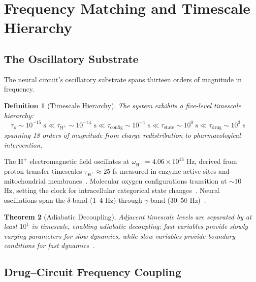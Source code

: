 \documentclass[twocolumn,10pt]{article}
\newtheorem{theorem}{Theorem}[section]
\newtheorem{definition}[theorem]{Definition}
\theoremstyle{remark}
\newcommand{\Hplus}{\mathrm{H}^{+}}
\begin{document}
\section{Frequency Matching and Timescale Hierarchy}
\label{sec:frequency}

\subsection{The Oscillatory Substrate}

The neural circuit's oscillatory substrate spans thirteen orders of magnitude in frequency.

\begin{definition}[Timescale Hierarchy]
\label{def:timescale}
The system exhibits a five-level timescale hierarchy:
\begin{equation}
  \tau_\rho \sim 10^{-15}\;\mathrm{s} \ll \tau_{\Hplus} \sim 10^{-14}\;\mathrm{s} \ll \tau_{\mathrm{config}} \sim 10^{-1}\;\mathrm{s} \ll \tau_{\mathrm{state}} \sim 10^{0}\;\mathrm{s} \ll \tau_{\mathrm{drug}} \sim 10^{3}\;\mathrm{s}
\end{equation}
spanning 18 orders of magnitude from charge redistribution to pharmacological intervention.
\end{definition}

The $\Hplus$ electromagnetic field oscillates at $\omega_{\Hplus} = 4.06 \times 10^{13}$ Hz, derived from proton transfer timescales $\tau_{\Hplus} \approx 25$ fs measured in enzyme active sites and mitochondrial membranes~\citep{marcus1993electron,klinman2013importance}. Molecular oxygen configurations transition at $\sim\!10$ Hz, setting the clock for intracellular categorical state changes~\citep{herzberg1950spectra}. Neural oscillations span the $\delta$-band (1--4 Hz) through $\gamma$-band (30--50 Hz)~\citep{buzsaki2004neuronal,fries2005mechanism}.

\begin{theorem}[Adiabatic Decoupling]
\label{thm:adiabatic}
Adjacent timescale levels are separated by at least $10^1$ in timescale, enabling adiabatic decoupling: fast variables provide slowly varying parameters for slow dynamics, while slow variables provide boundary conditions for fast dynamics~\citep{born1927quantentheorie}.
\end{theorem}

\subsection{Drug--Circuit Frequency Coupling}
\end{document}
